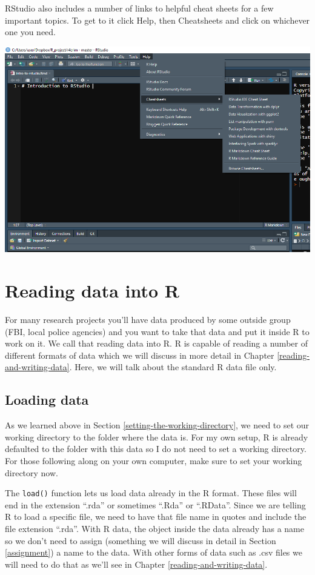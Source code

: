 \documentclass[
]{krantz}
\begin{document}
RStudio also includes a number of links to helpful cheat sheets for a few important topics. To get to it click Help, then Cheatsheets and click on whichever one you need.

\includegraphics{images/rstudio_4.PNG}

\hypertarget{reading-data-into-r}{%
\section{Reading data into R}\label{reading-data-into-r}}

For many research projects you'll have data produced by some outside group (FBI, local police agencies) and you want to take that data and put it inside R to work on it. We call that reading data into R. R is capable of reading a number of different formats of data which we will discuss in more detail in Chapter \ref{reading-and-writing-data}. Here, we will talk about the standard R data file only.

\hypertarget{loading-data}{%
\subsection{Loading data}\label{loading-data}}

As we learned above in Section \ref{setting-the-working-directory}, we need to set our working directory to the folder where the data is. For my own setup, R is already defaulted to the folder with this data so I do not need to set a working directory. For those following along on your own computer, make sure to set your working directory now.

The \texttt{load()} function lets us load data already in the R format. These files will end in the extension ``.rda'' or sometimes ``.Rda'' or ``.RData''. Since we are telling R to load a specific file, we need to have that file name in quotes and include the file extension ``.rda''. With R data, the object inside the data already has a name so we don't need to assign (something we will discuss in detail in Section \ref{assignment}) a name to the data. With other forms of data such as .csv files we will need to do that as we'll see in Chapter \ref{reading-and-writing-data}.
\end{document}
